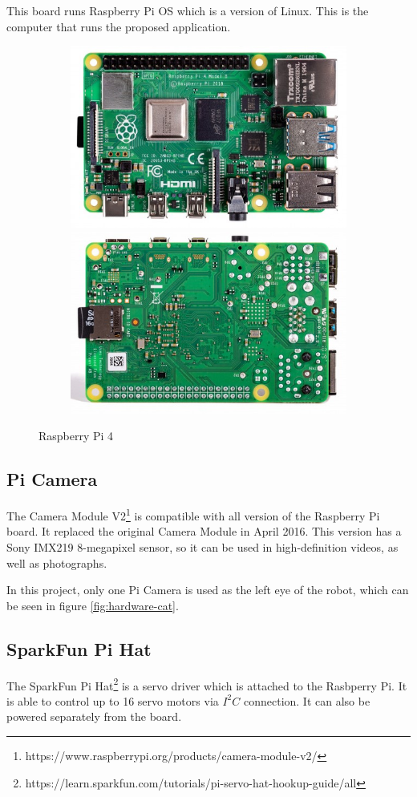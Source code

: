\documentclass[runningheads,a4paper,12pt]{report}
\begin{document}
This board runs Raspberry Pi OS which is a version of Linux. This is the computer that runs the proposed application. 

\begin{figure}
	\centering
	
	\begin{subfigure}{\linewidth}
  		\includegraphics[width=.45\linewidth]{./images/3_raspberrypi1}\hfill
  		\includegraphics[width=.45\linewidth]{./images/3_raspberrypi2}
  	\end{subfigure}
    
    \caption{Raspberry Pi 4}  
    \label{fig:raspi}
\end{figure}

\subsection*{Pi Camera}
The Camera Module V2\footnote{https://www.raspberrypi.org/products/camera-module-v2/} is compatible with all version of the Raspberry Pi board. It replaced the original Camera Module in April 2016. This version has a Sony IMX219 8-megapixel sensor, so it can be used in high-definition videos, as well as photographs. 

In this project, only one Pi Camera is used as the left eye of the robot, which can be seen in figure \ref{fig:hardware-cat}.

\subsection*{SparkFun Pi Hat}
The SparkFun Pi Hat\footnote{https://learn.sparkfun.com/tutorials/pi-servo-hat-hookup-guide/all} is a servo driver which is attached to the Rasbperry Pi. It is able to control up to 16 servo motors via $I^2C$ connection. It can also be powered separately from the board.
\end{document}
